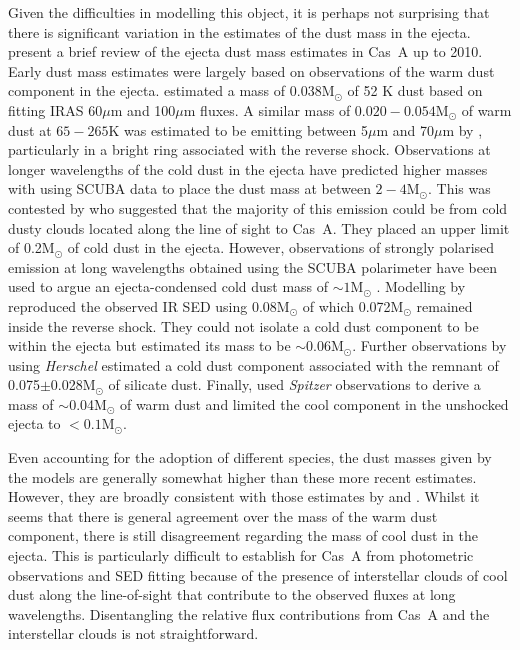 Given the difficulties in modelling this object, it is perhaps not surprising that there is significant variation in the estimates of the dust mass in the ejecta.  \citet{Barlow2010} present a brief review of the ejecta dust mass estimates in Cas~A up to 2010.  Early dust mass estimates were largely based on observations of the warm dust component in the ejecta.  \citet{Arendt1999} estimated a mass of 0.038M$_{\odot}$ of 52 K dust based on fitting IRAS 60$\mu$m and 100$\mu$m fluxes.  A similar mass of $0.020-0.054$M$_{\odot}$ of warm dust at $65-265$K was estimated to be emitting between 5$\mu$m and 70$\mu$m by \citet{Rho2008}, particularly in a bright ring associated with the reverse shock.  Observations at longer wavelengths of the cold dust in the ejecta have predicted higher masses with \citet{Dunne2003} using SCUBA data to place the dust mass at between $2-4$M$_{\odot}$.  This was contested by \citet{Krause2004} who suggested that the majority of this emission could be from cold dusty clouds located along the line of sight to Cas~A.  They placed an upper limit of 0.2M$_{\odot}$ of cold dust in the ejecta.  However, observations of strongly polarised emission at long wavelengths obtained using the SCUBA polarimeter have been used to argue an ejecta-condensed cold dust mass of $\sim1$M$_{\odot}$ \citep{Dunne2009}.  Modelling by \citet{Nozawa2010}  reproduced the observed IR SED using 0.08M$_{\odot}$ of which 0.072M$_{\odot}$ remained inside the reverse shock.  They could not isolate a cold dust component to be within the ejecta but estimated its mass to be $\sim0.06$M$_{\odot}$.  Further observations by \citet{Barlow2010} using {\em Herschel} estimated a cold dust component associated with the remnant of 0.075$\pm$0.028M$_{\odot}$ of silicate dust.  Finally, \citet{Arendt2014} used {\em Spitzer} observations to derive a  mass of $\sim$0.04M$_{\odot}$ of warm dust and limited the cool component in the unshocked ejecta to $<0.1$M$_{\odot}$.

Even accounting for the adoption of different species, the dust masses given by the models are generally somewhat higher than these more recent estimates.  However, they are broadly consistent with those estimates by \citet{Dunne2003} and \citet{Dunne2009}.  Whilst it seems that there is general agreement over the mass of the warm dust component, there is still disagreement regarding the mass of cool dust in the ejecta.  This is particularly difficult to establish for Cas~A from photometric observations and SED fitting because of the presence of interstellar clouds of cool dust along the line-of-sight that contribute to the observed fluxes at long wavelengths.  Disentangling the relative flux contributions from Cas~A and the interstellar clouds is not straightforward.

